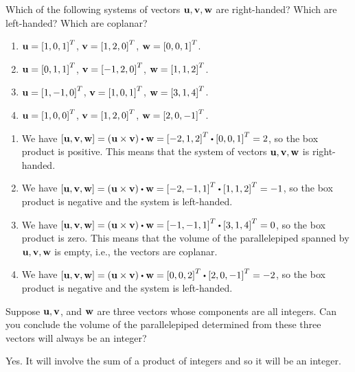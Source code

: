 \begin{ex}
  Which of the following systems of vectors
  $\vect{u},\vect{v},\vect{w}$ are right-handed? Which are
  left-handed? Which are coplanar?
  \begin{enumerate}
  \item $\vect{u}=\mat{1,0,1}^T$, $\vect{v}=\mat{1,2,0}^T$, $\vect{w}=\mat{0,0,1}^T$.
  \item $\vect{u}=\mat{0,1,1}^T$, $\vect{v}=\mat{-1,2,0}^T$, $\vect{w}=\mat{1,1,2}^T$.
  \item $\vect{u}=\mat{1,-1,0}^T$, $\vect{v}=\mat{1,0,1}^T$, $\vect{w}=\mat{3,1,4}^T$.
  \item $\vect{u}=\mat{1,0,0}^T$, $\vect{v}=\mat{1,2,0}^T$, $\vect{w}=\mat{2,0,-1}^T$.
  \end{enumerate}
  \begin{sol}
    \begin{enumerate}
    \item We have
      $\boxprod{\vect{u},\vect{v},\vect{w}} = (\vect{u}\times\vect{v})
      \dotprod \vect{w} = \mat{-2,1,2}^T\dotprod\mat{0,0,1}^T=2$, so
      the box product is positive. This means that the system of vectors
      $\vect{u},\vect{v},\vect{w}$ is right-handed.
    \item We have
      $\boxprod{\vect{u},\vect{v},\vect{w}} = (\vect{u}\times\vect{v})
      \dotprod \vect{w} = \mat{-2,-1,1}^T\dotprod\mat{1,1,2}^T=-1$, so
      the box product is negative and the system is left-handed.
    \item We have
      $\boxprod{\vect{u},\vect{v},\vect{w}} = (\vect{u}\times\vect{v})
      \dotprod \vect{w} = \mat{-1,-1,1}^T\dotprod\mat{3,1,4}^T=0$, so
      the box product is zero. This means that the volume of the
      parallelepiped spanned by $\vect{u},\vect{v},\vect{w}$ is empty,
      i.e., the vectors are coplanar.
    \item We have
      $\boxprod{\vect{u},\vect{v},\vect{w}} = (\vect{u}\times\vect{v})
      \dotprod \vect{w} = \mat{0,0,2}^T\dotprod\mat{2,0,-1}^T=-2$, so
      the box product is negative and the system is left-handed.
    \end{enumerate}
  \end{sol}
\end{ex}

\begin{ex}
  Suppose $\vect{u},\vect{v}$, and $\vect{w}$ are three vectors whose
  components are all integers. Can you conclude the volume of the
  parallelepiped determined from these three vectors will always be an
  integer?
  \begin{sol}
    Yes. It will involve the sum of a product of integers and so it will
    be an integer.
  \end{sol}
\end{ex}

